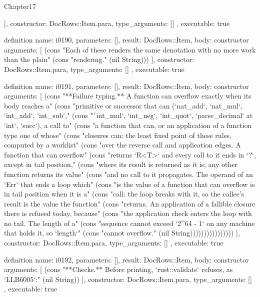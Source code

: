\begin{lexlean}{Chapter17}
\begin{semanticmodule}
{{    ],
    constructor: DocRows::Item.para,
    type_arguments: []
  },
  executable: true
}

definition{
  name: i0190,
  parameters: [],
  result: DocRows::Item,
  body: constructor{
    arguments: [
      (cons "Each of these renders the same denotation with no more work than the plain" (cons "rendering." (nil String)))
    ],
    constructor: DocRows::Item.para,
    type_arguments: []
  },
  executable: true
}

definition{
  name: i0191,
  parameters: [],
  result: DocRows::Item,
  body: constructor{
    arguments: [
      (cons "**Failure typing.** A function can overflow exactly when its body reaches a" (cons "primitive or successor that can (`nat_add`, `nat_mul`, `int_add`, `int_sub`," (cons "`int_mul`, `int_neg`, `int_quot`, `parse_decimal` at `int`, `succ`), a call to" (cons "a function that can, or an application of a function type one of whose" (cons "closures can: the least fixed point of these rules, computed by a worklist" (cons "over the reverse call and application edges. A function that can overflow" (cons "returns `R<T>` and every call to it ends in `?`, except in tail position," (cons "where its result is returned as it is; any other function returns its value" (cons "and no call to it propagates. The operand of an `Err` that ends a loop which" (cons "is the value of a function that can overflow is in tail position when it is a" (cons "call: the loop breaks with it, so the callee's result is the value the function" (cons "returns. An application of a fallible closure there is refused today, because" (cons "the application check enters the loop with no tail. The length of a" (cons "sequence cannot exceed `2^64 - 1` on any machine that holds it, so `length`" (cons "cannot overflow." (nil String))))))))))))))))
    ],
    constructor: DocRows::Item.para,
    type_arguments: []
  },
  executable: true
}

definition{
  name: i0192,
  parameters: [],
  result: DocRows::Item,
  body: constructor{
    arguments: [
      (cons "**Checks.** Before printing, `rust::validate` refuses, as `LLB6005`:" (nil String))
    ],
    constructor: DocRows::Item.para,
    type_arguments: []
  },
  executable: true
}


\end{semanticmodule}
\end{lexlean}
